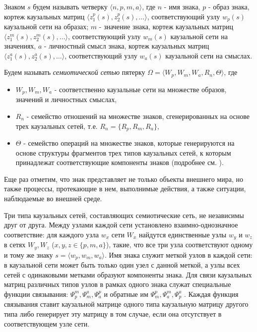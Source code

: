 \documentclass[12pt]{report}
\begin{document}
	Знаком $s$ будем называть четверку $\langle n, p, m, a\rangle$, где $n$ - имя знака, $p$ - образ знака, кортеж каузальных матриц $\langle z_1^p(s), z_2^p(s), \dots\rangle$, соответствующий узлу $w_p(s)$ каузальной сети на образах;  $m$ - значение знака, кортеж каузальных матриц $\langle z_1^m(s), z_2^m(s), \dots\rangle$, соответствующий узлу $w_m(s)$ каузальной сети на значениях,  $a$ - личностный смысл знака, кортеж каузальных матриц $\langle z_1^a(s), z_2^a(s), \dots\rangle$, соответствующий узлу $w_a(s)$ каузальной сети на смыслах.
	
	Будем называть \textit{семиотической сетью} пятерку $\Omega=\langle W_p, W_m, W_a, R_n, \Theta \rangle$, где
	\begin{itemize}
		\item $W_p, W_m, W_a$ - соответственно каузальные сети на множестве образов, значений и личностных смыслах,
		\item $R_n$ - семейство отношений на множестве знаков, сгенерированных на основе трех каузальных сетей, т.е. $R_n=\{R_p, R_m, R_a\}$,
		\item $\Theta$ - семейство операций на множестве знаков, которые  генерируются на основе структуры фрагментов трех типов каузальных сетей, к которым принадлежат соответствующие компоненты знаков (подробнее см. \cite{Osipov2014c}).
	\end{itemize} 
	
	Еще раз отметим, что знак представляет не только объекты внешнего мира, но также процессы, протекающие в нем, выполнимые действия, а также ситуации, наблюдаемые во внешней среде.
	
	Три типа каузальных сетей, составляющих семиотические сеть, не независимы друг от друга. Между узлами каждой сети установлено взаимно-однозначное соответствие: для каждого узла $w_x$ сети $W_x$ найдутся единственные узлы $w_y$ и $w_z$ в сетях $W_y, W_z$ ($x,y,z\in\{p,m,a\}$), такие, что все три узла соответствуют одному и тому же знаку $s=\langle w_p, w_m, w_a\rangle$. Имя знака служит меткой узлов в каждой сети: в каузальной сети может быть только один узел с данной меткой, а узлы всех сетей с одинаковыми метками образуют компоненты знака. Для связи каузальных матриц различных типов узлов в рамках одного знака служат специальные функции связывания: $\Psi_p^m, \Psi_m^a,\Psi_a^p$ и обратные им $\Psi_m^p,\Psi_a^m,\Psi_p^a$ \cite{Osipov2014c}. Каждая функция связывания ставит каузальной матрице одного типа каузальную матрицу другого типа либо генерирует эту матрицу в том случае, если она отсутствует в соответствующем узле сети.
	
\end{document}
